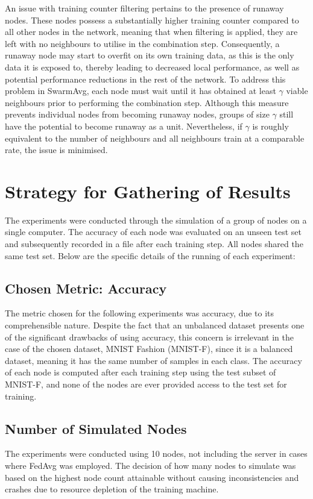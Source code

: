 \documentclass[letterpaper, 10 pt, conference]{ieeeconf}  %
\begin{document}
An issue with training counter filtering pertains to the presence of runaway nodes. These nodes possess a substantially higher training counter compared to all other nodes in the network, meaning that when filtering is applied, they are left with no neighbours to utilise in the combination step. Consequently, a runaway node may start to overfit on its own training data, as this is the only data it is exposed to, thereby leading to decreased local performance, as well as potential performance reductions in the rest of the network. To address this problem in SwarmAvg, each node must wait until it has obtained at least $\gamma$ viable neighbours prior to performing the combination step. Although this measure prevents individual nodes from becoming runaway nodes, groups of size $\gamma$ still have the potential to become runaway as a unit. Nevertheless, if $\gamma$ is roughly equivalent to the number of neighbours and all neighbours train at a comparable rate, the issue is minimised.

\section{Strategy for Gathering of Results}\label{strats}
The experiments were conducted through the simulation of a group of nodes on a single computer. The accuracy of each node was evaluated on an unseen test set and subsequently recorded in a file after each training step. All nodes shared the same test set. Below are the specific details of the running of each experiment:

\subsection{Chosen Metric: Accuracy}
The metric chosen for the following experiments was accuracy, due to its comprehensible nature. Despite the fact that an unbalanced dataset presents one of the significant drawbacks of using accuracy, this concern is irrelevant in the case of the chosen dataset, MNIST Fashion (MNIST-F), since it is a balanced dataset, meaning it has the same number of samples in each class. The accuracy of each node is computed after each training step using the test subset of MNIST-F, and none of the nodes are ever provided access to the test set for training.

\subsection{Number of Simulated Nodes}
The experiments were conducted using 10 nodes, not including the server in cases where FedAvg was employed. The decision of how many nodes to simulate was based on the highest node count attainable without causing inconsistencies and crashes due to resource depletion of the training machine.
\end{document}

